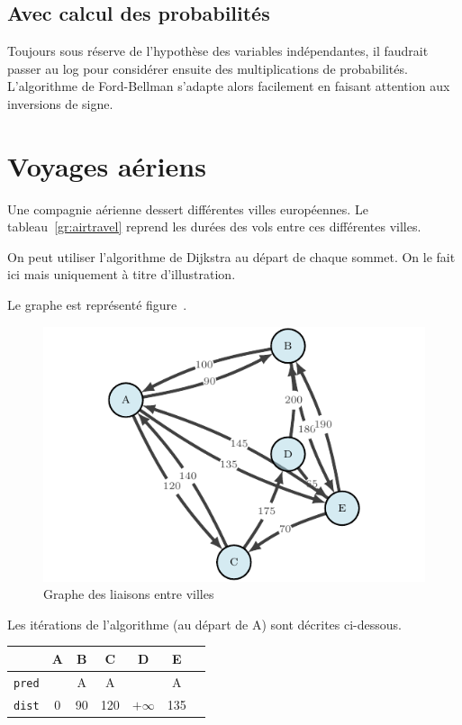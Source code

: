 \documentclass[paper=a4, fontsize=11pt]{scrartcl} %
\numberwithin{equation}{section} %
\numberwithin{figure}{section} %
\numberwithin{table}{section} %
\begin{document}
\subsection{Avec calcul des probabilités}

Toujours sous réserve de l'hypothèse des variables indépendantes, il faudrait passer au log pour considérer ensuite des multiplications de probabilités. L'algorithme de Ford-Bellman s'adapte alors facilement en faisant attention aux inversions de signe.


\section{Voyages aériens}

Une compagnie aérienne dessert différentes villes européennes. Le tableau~\ref{gr:airtravel} reprend les durées des vols entre ces différentes villes. 

On peut utiliser l'algorithme de Dijkstra au départ de chaque sommet. On le fait ici mais uniquement à titre d'illustration.

Le graphe est représenté figure~\label{fig:airline}.

\begin{figure}
  \begin{center}
    \includegraphics[width=12cm]{airline.pdf}
    \caption{Graphe des liaisons entre villes}
    \label{fig:airline}
  \end{center}
\end{figure}

Les itérations de l'algorithme (au départ de A) sont décrites ci-dessous. 

  
\begin{tabular}{c|cccccc}
  & \textbf{A}	&B	&C	&D	&E	& \\
  \hline
  \texttt{pred} &	&A	&A	&	&A	&\\
  \texttt{dist} & 0	&90	&120	&$+\infty$	&135	&\\
\end{tabular}
\end{document}
